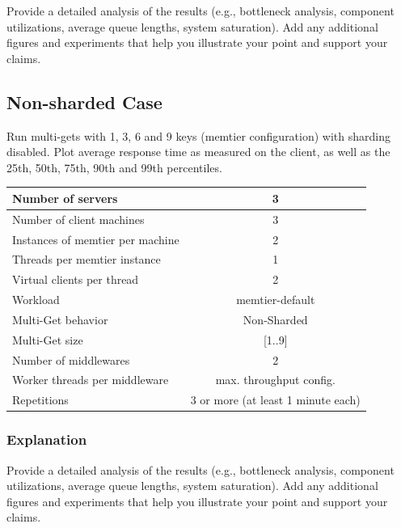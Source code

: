 \documentclass[11pt,a4paper]{article}
\begin{document}
Provide a detailed analysis of the results (e.g., bottleneck analysis, component utilizations, average queue lengths, system saturation). Add any additional figures and experiments that help you illustrate your point and support your claims.

\subsection{Non-sharded Case}

Run multi-gets with 1, 3, 6 and 9 keys (memtier configuration) with sharding disabled. Plot average response time as measured on the client, as well as the 25th, 50th, 75th, 90th and 99th percentiles.

\begin{center}
	\scriptsize{
		\begin{tabular}{|l|c|}
			\hline Number of servers                & 3                       \\
			\hline Number of client machines        & 3                       \\
			\hline Instances of memtier per machine & 2                       \\
			\hline Threads per memtier instance     & 1                       \\
			\hline Virtual clients per thread       & 2                		 \\
			\hline Workload                         & memtier-default             \\
			\hline Multi-Get behavior               & Non-Sharded             \\
			\hline Multi-Get size                   & [1..9]                  \\
			\hline Number of middlewares            & 2                       \\
			\hline Worker threads per middleware    & max. throughput config. \\
			\hline Repetitions                      & 3 or more (at least 1 minute each)               \\
			\hline
		\end{tabular}
	}
\end{center}

\subsubsection{Explanation}

Provide a detailed analysis of the results (e.g., bottleneck analysis, component utilizations, average queue lengths, system saturation). Add any additional figures and experiments that help you illustrate your point and support your claims.
\end{document}
